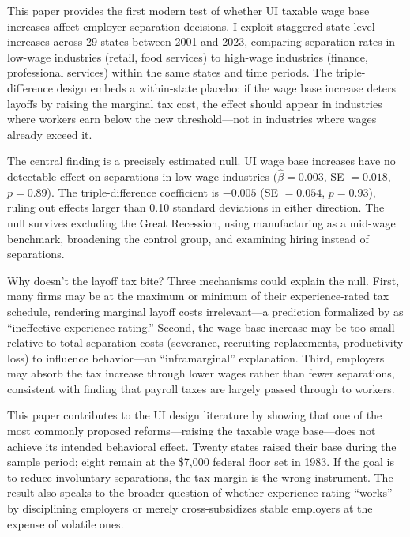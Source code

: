 \documentclass[12pt]{article}
\begin{document}
This paper provides the first modern test of whether UI taxable wage base increases affect employer separation decisions. I exploit staggered state-level increases across 29 states between 2001 and 2023, comparing separation rates in low-wage industries (retail, food services) to high-wage industries (finance, professional services) within the same states and time periods. The triple-difference design embeds a within-state placebo: if the wage base increase deters layoffs by raising the marginal tax cost, the effect should appear in industries where workers earn below the new threshold---not in industries where wages already exceed it.

The central finding is a precisely estimated null. UI wage base increases have no detectable effect on separations in low-wage industries ($\hat{\beta} = 0.003$, SE $= 0.018$, $p = 0.89$). The triple-difference coefficient is $-0.005$ (SE $= 0.054$, $p = 0.93$), ruling out effects larger than 0.10 standard deviations in either direction. The null survives excluding the Great Recession, using manufacturing as a mid-wage benchmark, broadening the control group, and examining hiring instead of separations.

Why doesn't the layoff tax bite? Three mechanisms could explain the null. First, many firms may be at the maximum or minimum of their experience-rated tax schedule, rendering marginal layoff costs irrelevant---a prediction formalized by \citet{anderson1993} as ``ineffective experience rating.'' Second, the wage base increase may be too small relative to total separation costs (severance, recruiting replacements, productivity loss) to influence behavior---an ``inframarginal'' explanation. Third, employers may absorb the tax increase through lower wages rather than fewer separations, consistent with \citet{gruber1997} finding that payroll taxes are largely passed through to workers.

This paper contributes to the UI design literature by showing that one of the most commonly proposed reforms---raising the taxable wage base---does not achieve its intended behavioral effect. Twenty states raised their base during the sample period; eight remain at the \$7,000 federal floor set in 1983. If the goal is to reduce involuntary separations, the tax margin is the wrong instrument. The result also speaks to the broader question of whether experience rating ``works'' by disciplining employers \citep{blanchard2006} or merely cross-subsidizes stable employers at the expense of volatile ones.
\end{document}

